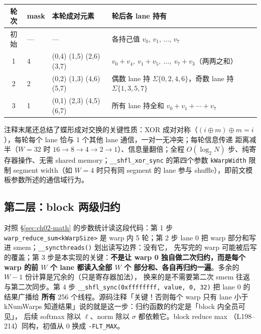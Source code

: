 \begin{center}
\begin{tabular}{clp{4.2cm}p{6.2cm}}
\toprule
轮次 & mask & 本轮成对元素 & 轮后各 lane 持有 \\
\midrule
初始 & --- & --- & 各持己值 $v_0,\, v_1,\, \dots,\, v_7$ \\
1 & 4 & (0,4) (1,5) (2,6) (3,7) & $v_0{+}v_4,\ v_1{+}v_5,\ \dots,\ v_7{+}v_3$（两两之和） \\
2 & 2 & (0,2) (1,3) (4,6) (5,7) & 偶数 lane 持 $\Sigma\{0,2,4,6\}$，奇数 lane 持 $\Sigma\{1,3,5,7\}$ \\
3 & 1 & (0,1) (2,3) (4,5) (6,7) & 所有 lane 持全和 $v_0 + v_1 + \cdots + v_7$ \\
\bottomrule
\end{tabular}
\end{center}

注释末尾还总结了蝶形成对交换的关键性质：XOR 成对对称（$(i \oplus m) \oplus m
= i$），每轮每个 lane 恰与 1 个其他 lane 通信，一对一无冲突；每轮信息传递
距离减半（$W{=}32$ 时 $16 \to 8 \to 4 \to 2 \to 1$）、信息量翻倍；全程
$O(\log_2 N)$ 步、纯寄存器操作、无需 shared memory；\texttt{\_\_shfl\_xor\_sync}
的第四个参数 \texttt{kWarpWidth} 限制 segment width（如 $W{=}4$ 时只有同
segment 的 lane 参与 shuffle），即前文模板参数所述的通信域行为。

\subsection{第二层：block 两级归约}\label{sec:ch02-block}



对照 \S\ref{sec:ch02-math} 的步数统计读这段代码：第 1 步
\texttt{warp\_\allowbreak{}reduce\_\allowbreak{}sum\allowbreak{}<k\allowbreak{}Warp\allowbreak{}Size>} 是 warp 内 5 轮；第 2 步 lane 0 把
warp 部分和写进 smem；\texttt{\_\allowbreak{}\_\allowbreak{}syncthreads\allowbreak{}()} 划出读写边界：没有它，
先写完的 warp 可能被后写的覆盖；第 3 步是本实现的关键：\textbf{不是让
warp 0 独自做二次归约，而是每个 warp 的前 $W$ 个 lane 都读入全部 $W$ 个
部分和、各自再归约一遍}。多余的 $W-1$ 份计算是冗余的（只是寄存器加法），
换来的是不需要第二次 smem 往返与第二次同步。第 4 步
\texttt{\_\allowbreak{}\_\allowbreak{}shfl\_\allowbreak{}sync\allowbreak{}(0xffffffff,\allowbreak{} value,\allowbreak{} 0,\allowbreak{} 32)} 把 lane 0 的结果广播给
\textbf{所有} 256 个线程。源码注释「关键！否则每个 warp 只有 lane 小于
kNumWarps 知道结果」说的就是这一步：归约函数的约定是「block 内全员可见」，
后续 softmax 除以 $\ell$、norm 除以 $\sigma$ 都依赖它。block reduce max
（L198--214）同构，初值从 0 换成 \texttt{-FLT\_MAX}。

